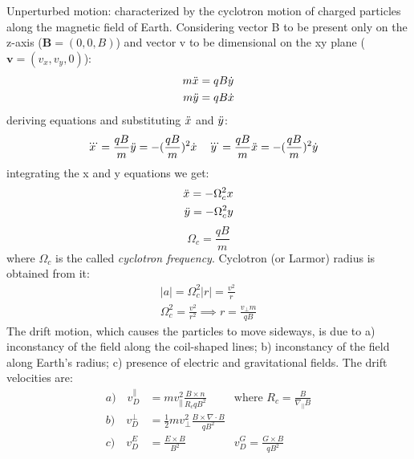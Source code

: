 \documentclass[12pt,a4paper]{article}
\begin{document}
Unperturbed motion: characterized by the cyclotron motion of charged particles along the magnetic field of Earth. Considering vector B to be present only on the z-axis ($\textbf{B}=(0,0,\textit{B})$) and vector v to be dimensional on the xy plane ($\textbf{v}=(\textit{$v_x$},\textit{$v_y$},0)$):
\begin{equation}
\begin{split}
m\Ddot{x}&=qB\dot{y} \\ m\Ddot{y}&=qB\dot{x} 
\end{split}
\end{equation}
deriving equations and substituting $\Ddot{x}$ and $\Ddot{y}$:
\begin{equation}
    \begin{split}
        \dddot{x}&=\frac{qB}{m}\Ddot{y}=-(\frac{qB}{m})^2\dot{x} & \dddot{y}&=\frac{qB}{m}\Ddot{x}=-(\frac{qB}{m})^2\dot{y}
    \end{split}
\end{equation}
integrating the x and y equations we get:
\begin{equation}
\begin{split}
\Ddot{x}=-\Omega_c^2x \\
\Ddot{y}=-\Omega_c^2y \\
\end{split}
\end{equation}
\begin{equation}
    \Omega_c=\frac{qB}{m}
\end{equation}
where $\Omega_c$ is the called \textit{cyclotron frequency}. Cyclotron (or Larmor) radius is obtained from it:
\begin{equation}
\begin{split}
\label{11}
    |a|=\Omega_c^2|r|=\frac{v^2}{r} \\
    \Omega_c^2=\frac{v^2}{r^2}{\implies}r=\frac{v_{\bot}m}{qB}
\end{split}    
\end{equation}
The drift motion, which causes the particles to move sideways, is due to a) inconstancy of the field along the coil-shaped lines; b) inconstancy of the field along Earth's radius; c) presence of electric and gravitational fields. The drift velocities are:
\begin{align}
    \label{12}
    a){\quad}v_D^\|&=mv_\|^2\frac{B{\times}n}{R_cqB^2} & \textrm{where }R_c=\frac{B}{\nabla_\|B} \\
    b){\quad}v_D^\bot&=\frac{1}{2}mv^2_\bot\frac{B\times{\nabla}{\cdot}B}{qB^2} \\
    \label{14}
    c){\quad}v^E_D&=\frac{E\times B}{B^2} & v^G_D=\frac{G\times B}{qB^2}
\end{align}
\end{document}

